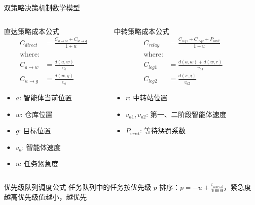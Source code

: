 \documentclass[
10pt,
aspectratio=169,
]{beamer}
\begin{document}
\begin{frame}{双策略决策机制数学模型}
    \begin{columns}
        \begin{column}{0.5\textwidth}
            \begin{block}{直达策略成本公式}
                \begin{align}
                    C_{direct} &= \frac{C_{a \to w} + C_{w \to g}}{1 + u} \\
                    \text{where:} \\
                    C_{a \to w} &= \frac{d(a,w)}{v_a} \\
                    C_{w \to g} &= \frac{d(w,g)}{v_a}
                \end{align}
                
                \begin{itemize}
                    \item $a$: 智能体当前位置
                    \item $w$: 仓库位置
                    \item $g$: 目标位置
                    \item $v_a$: 智能体速度
                    \item $u$: 任务紧急度
                \end{itemize}
            \end{block}
        \end{column}
        \begin{column}{0.5\textwidth}
            \begin{alertblock}{中转策略成本公式}
                \begin{align}
                    C_{relay} &= \frac{C_{leg1} + C_{leg2} + P_{wait}}{1 + u} \\
                    \text{where:} \\
                    C_{leg1} &= \frac{d(a,w) + d(w,r)}{v_{a1}} \\
                    C_{leg2} &= \frac{d(r,g)}{v_{a2}}
                \end{align}
                
                \begin{itemize}
                    \item $r$: 中转站位置
                    \item $v_{a1},v_{a2}$: 第一、二阶段智能体速度
                    \item $P_{wait}$: 等待惩罚系数
                \end{itemize}
            \end{alertblock}
        \end{column}
    \end{columns}
    
    \begin{exampleblock}{优先级队列调度公式}
        任务队列中的任务按优先级 $p$ 排序：$p = -u + \frac{t_{\text{arrival}}}{10000}$，紧急度越高优先级值越小，越优先
    \end{exampleblock}
\end{frame}
\end{document}
